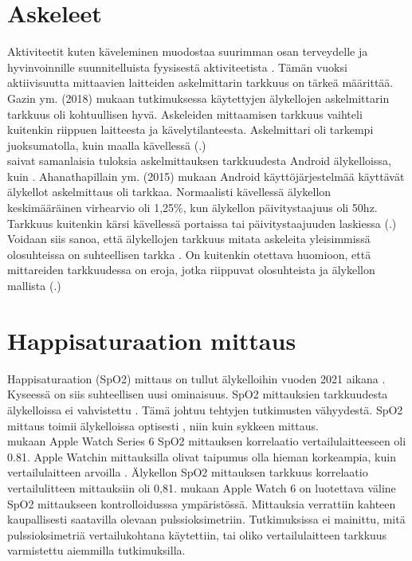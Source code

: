 \documentclass[utf8,bachelor,finnish]{bachelor}
\begin{document}
  \section{Askeleet}
  Aktiviteetit kuten käveleminen muodostaa suurimman osan terveydelle ja hyvinvoinnille suunnitelluista fyysisestä aktiviteetista \parencite{gaz_determining_2018}.
   Tämän vuoksi aktiivisuutta mittaavien laitteiden askelmittarin tarkkuus on tärkeä määrittää.
    Gazin ym. (2018) mukaan tutkimuksessa käytettyjen älykellojen askelmittarin tarkkuus oli kohtuullisen hyvä. Askeleiden mittaamisen tarkkuus
     vaihteli kuitenkin riippuen laitteesta ja kävelytilanteesta. Askelmittari oli tarkempi juoksumatolla, kuin
      maalla kävellessä (\cite{gaz_determining_2018}.)\\
  
  \textcite{ahanathapillai_preliminary_2015} saivat samanlaisia tuloksia askelmittauksen tarkkuudesta Android älykelloissa, kuin \textcite{gaz_determining_2018}.
   Ahanathapillain ym. (2015) mukaan Android käyttöjärjestelmää käyttävät älykellot askelmittaus oli tarkkaa.
    Normaalisti kävellessä älykellon keskimääräinen virhearvio oli 1,25\%, kun älykellon päivitystaajuus oli 50hz.
     Tarkkuus kuitenkin kärsi kävellessä portaissa tai päivitystaajuuden laskiessa (\cite{ahanathapillai_preliminary_2015}.)\\
  
  Voidaan siis sanoa, että älykellojen tarkkuus mitata askeleita yleisimmissä olosuhteissa on suhteellisen tarkka
   \parencite{gaz_determining_2018,ahanathapillai_preliminary_2015}. On kuitenkin otettava huomioon, että mittareiden
    tarkkuudessa on eroja, jotka riippuvat olosuhteista ja älykellon mallista (\cite{gaz_determining_2018}.)
  

  \section{Happisaturaation mittaus}
  Happisaturaation (SpO2) mittaus on tullut älykelloihin vuoden 2021 aikana \parencite{zhang_can_2022}. Kyseessä on siis suhteellisen uusi ominaisuus.
   SpO2 mittauksien tarkkuudesta älykelloissa ei vahvistettu \parencite{zhang_can_2022}. Tämä johtuu tehtyjen tutkimusten vähyydestä.
    SpO2 mittaus toimii älykelloissa optisesti \parencite{windisch_accuracy_2023}, niin kuin sykkeen mittaus.\\
    
  \textcite{pipek_comparison_2021} mukaan Apple Watch Series 6 SpO2 mittauksen korrelaatio vertailulaitteeseen oli 0.81.
   Apple Watchin mittauksilla olivat taipumus olla hieman korkeampia, kuin vertailulaitteen arvoilla \parencite{pipek_comparison_2021}.
    Älykellon SpO2 mittauksen tarkkuus korrelaatio vertailulitteen mittauksiin oli 0,81.
     \textcite{pipek_comparison_2021} mukaan Apple Watch 6 on luotettava väline SpO2 mittaukseen kontrolloidusssa ympäristössä.
      Mittauksia verrattiin kahteen kaupallisesti saatavilla olevaan pulssioksimetriin.
       Tutkimuksissa ei mainittu, mitä pulssioksimetriä vertailukohtana käytettiin, tai oliko vertailulaitteen tarkkuus varmistettu aiemmilla tutkimuksilla.
   
\end{document}
